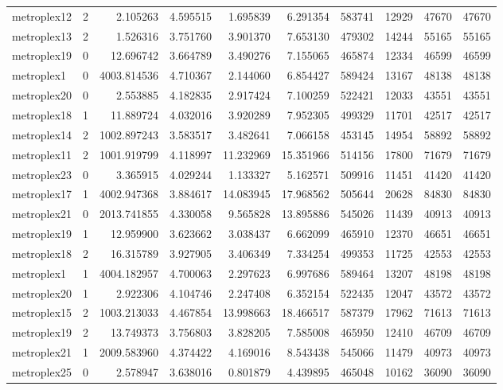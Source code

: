 \documentclass[../../../thesis.tex]{subfiles}
\begin{document}
\begin{longtable}{|l|r|r|r|r|r|r|r|r|r|}
metroplex12 & 2 & 2.105263 & 4.595515 & 1.695839 & 6.291354 & 583741 & 12929 & 47670 & 47670 \\
metroplex13 & 2 & 1.526316 & 3.751760 & 3.901370 & 7.653130 & 479302 & 14244 & 55165 & 55165 \\
metroplex19 & 0 & 12.696742 & 3.664789 & 3.490276 & 7.155065 & 465874 & 12334 & 46599 & 46599 \\
metroplex1 & 0 & 4003.814536 & 4.710367 & 2.144060 & 6.854427 & 589424 & 13167 & 48138 & 48138 \\
metroplex20 & 0 & 2.553885 & 4.182835 & 2.917424 & 7.100259 & 522421 & 12033 & 43551 & 43551 \\
metroplex18 & 1 & 11.889724 & 4.032016 & 3.920289 & 7.952305 & 499329 & 11701 & 42517 & 42517 \\
metroplex14 & 2 & 1002.897243 & 3.583517 & 3.482641 & 7.066158 & 453145 & 14954 & 58892 & 58892 \\
metroplex11 & 2 & 1001.919799 & 4.118997 & 11.232969 & 15.351966 & 514156 & 17800 & 71679 & 71679 \\
metroplex23 & 0 & 3.365915 & 4.029244 & 1.133327 & 5.162571 & 509916 & 11451 & 41420 & 41420 \\
metroplex17 & 1 & 4002.947368 & 3.884617 & 14.083945 & 17.968562 & 505644 & 20628 & 84830 & 84830 \\
metroplex21 & 0 & 2013.741855 & 4.330058 & 9.565828 & 13.895886 & 545026 & 11439 & 40913 & 40913 \\
metroplex19 & 1 & 12.959900 & 3.623662 & 3.038437 & 6.662099 & 465910 & 12370 & 46651 & 46651 \\
metroplex18 & 2 & 16.315789 & 3.927905 & 3.406349 & 7.334254 & 499353 & 11725 & 42553 & 42553 \\
metroplex1 & 1 & 4004.182957 & 4.700063 & 2.297623 & 6.997686 & 589464 & 13207 & 48198 & 48198 \\
metroplex20 & 1 & 2.922306 & 4.104746 & 2.247408 & 6.352154 & 522435 & 12047 & 43572 & 43572 \\
metroplex15 & 2 & 1003.213033 & 4.467854 & 13.998663 & 18.466517 & 587379 & 17962 & 71613 & 71613 \\
metroplex19 & 2 & 13.749373 & 3.756803 & 3.828205 & 7.585008 & 465950 & 12410 & 46709 & 46709 \\
metroplex21 & 1 & 2009.583960 & 4.374422 & 4.169016 & 8.543438 & 545066 & 11479 & 40973 & 40973 \\
metroplex25 & 0 & 2.578947 & 3.638016 & 0.801879 & 4.439895 & 465048 & 10162 & 36090 & 36090 \\

\end{longtable}
\end{document}

